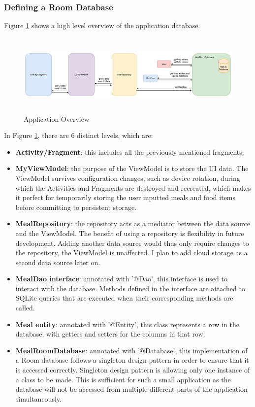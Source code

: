 \documentclass{article}
\begin{document}
\newpage
\subsubsection{Defining a Room Database}
\label{text:room_database}
Figure \ref{fig:application_overview} shows a high level overview of the application database.

\bigskip
\begin{figure}[h]
    \hspace*{-3cm} 
    \includegraphics[height = 4cm]{ViewModel_wide.png}
    \caption{Application Overview}
    \label{fig:application_overview}
\end{figure}

\bigskip
\noindent In Figure \ref{fig:application_overview}, there are 6 distinct levels, which are: 

\bigskip
\begin{itemize}
    \item \textbf{Activity/Fragment}: this includes all the previously mentioned fragments.
    \item \textbf{MyViewModel}: the purpose of the ViewModel is to store the UI data. The ViewModel survives configuration changes, such as device rotation, during which the Activities and Fragments are destroyed and recreated, which makes it perfect for temporarily storing the user inputted meals and food items before committing to persistent storage.
    \item \textbf{MealRepository}: the repository acts as a mediator between the data source and the ViewModel. The benefit of using a repository is flexibility in future development. Adding another data source would thus only require changes to the repository, the ViewModel is unaffected. I plan to add cloud storage as a second data source later on.
    \item \textbf{MealDao interface}: annotated with '@Dao', this interface is used to interact with the database. Methods defined in the interface are attached to SQLite queries that are executed when their corresponding methods are called.
    \item \textbf{Meal entity}: annotated with '@Entity', this class represents a row in the database, with getters and setters for the columns in that row. 
    \item \textbf{MealRoomDatabase}: annotated with '@Database', this implementation of a Room database follows a singleton design pattern in order to ensure that it is accessed correctly. Singleton design pattern is allowing only one instance of a class to be made. This is sufficient for such a small application as the database will not be accessed from multiple different parts of the application simultaneously. 
\end{itemize}
\end{document}
